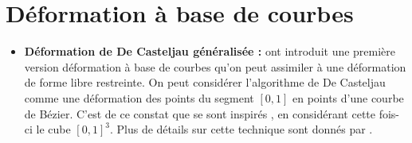 \section{Déformation à base de courbes}
\begin{itemize}
\item{\textbf{Déformation de De Casteljau généralisée :}} \cite{CR94}
  ont introduit une première version déformation à base de courbes
  qu'on peut assimiler à une déformation de forme libre restreinte. On
  peut considérer l'algorithme de De Casteljau comme une déformation
  des points du segment $[0,1]$ en points d'une courbe de
  Bézier. C'est de ce constat que se sont inspirés \cite{CR94}, en
  considérant cette fois-ci le cube $[0,1]^3$. Plus de détails sur
  cette technique sont donnés par \cite{BE01}.
\end{itemize}

